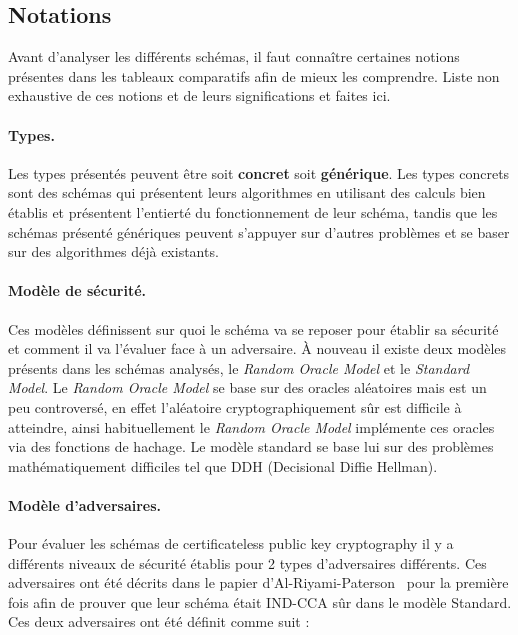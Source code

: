 \subsection{Notations}
\label{subsec:asavoir}
Avant d'analyser les différents schémas, il faut connaître certaines notions présentes dans les tableaux comparatifs afin de mieux les comprendre. Liste non exhaustive de ces notions et de leurs significations et faites ici.

\paragraph*{Types.}Les types présentés peuvent être soit \textbf{concret} soit \textbf{générique}. Les types concrets sont des schémas qui présentent leurs algorithmes en utilisant des calculs bien établis et présentent l'entierté du fonctionnement de leur schéma, tandis que les schémas présenté génériques peuvent s'appuyer sur d'autres problèmes et se baser sur des algorithmes déjà existants.

\paragraph*{Modèle de sécurité.} Ces modèles définissent sur quoi le schéma va se reposer pour établir sa sécurité et comment il va l'évaluer face à un adversaire. À nouveau il existe deux modèles présents dans les schémas analysés, le \textit{Random Oracle Model} et le \textit{Standard Model}. Le \textit{Random Oracle Model} se base sur des oracles aléatoires mais est un peu controversé, en effet l'aléatoire cryptographiquement sûr est difficile à atteindre, ainsi habituellement le \textit{Random Oracle Model} implémente ces oracles via des fonctions de hachage. Le modèle standard se base lui sur des problèmes mathématiquement difficiles tel que DDH (Decisional Diffie Hellman).

\paragraph*{Modèle d'adversaires.}
Pour évaluer les schémas de certificateless public key cryptography il y a différents niveaux de sécurité établis pour 2 types d'adversaires différents. Ces adversaires ont été décrits dans le papier d'Al-Riyami-Paterson~\cite{DBLP:conf/asiacrypt/Al-RiyamiP03} pour la première fois afin de prouver que leur schéma était IND-CCA sûr dans le modèle Standard. Ces deux adversaires ont été définit comme suit :

